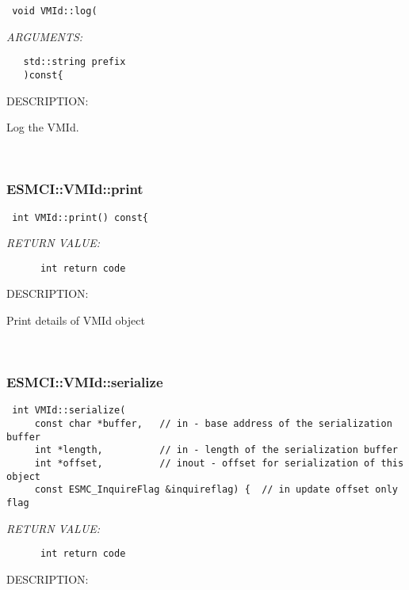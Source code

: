   
\begin{verbatim} void VMId::log(\end{verbatim}{\em ARGUMENTS:}
\begin{verbatim}   std::string prefix
   )const{\end{verbatim}
{\sf DESCRIPTION:\\ }


     Log the VMId.
   
 
\mbox{}\hrulefill\
 
\subsubsection [ESMCI::VMId::print] {ESMCI::VMId::print}


  
\begin{verbatim} int VMId::print() const{\end{verbatim}{\em RETURN VALUE:}
\begin{verbatim}      int return code\end{verbatim}
{\sf DESCRIPTION:\\ }


      Print details of VMId object
   
 
\mbox{}\hrulefill\
 
\subsubsection [ESMCI::VMId::serialize] {ESMCI::VMId::serialize}


  
\begin{verbatim} int VMId::serialize(
     const char *buffer,   // in - base address of the serialization buffer
     int *length,          // in - length of the serialization buffer
     int *offset,          // inout - offset for serialization of this object
     const ESMC_InquireFlag &inquireflag) {  // in update offset only flag\end{verbatim}{\em RETURN VALUE:}
\begin{verbatim}      int return code\end{verbatim}
{\sf DESCRIPTION:\\ }


